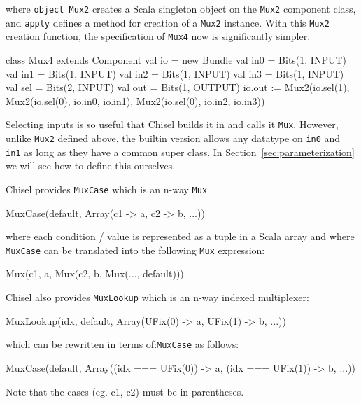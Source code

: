 \documentclass[twocolumn,10pt]{article}
\def\code#1{{\tt #1}}
\begin{document}
\noindent
where \code{object Mux2} creates a Scala singleton object on the \code{Mux2}
component class, and \code{apply} defines a method for creation of a \code{Mux2} instance.
%
With this \code{Mux2} creation function, the specification of \code{Mux4} now is
significantly simpler.

\begin{scala}
class Mux4 extends Component {
  val io = new Bundle {
    val in0 = Bits(1, INPUT)
    val in1 = Bits(1, INPUT)
    val in2 = Bits(1, INPUT)
    val in3 = Bits(1, INPUT)
    val sel = Bits(2, INPUT)
    val out = Bits(1, OUTPUT)
  }
  io.out := Mux2(io.sel(1),
                 Mux2(io.sel(0), io.in0, io.in1),
                 Mux2(io.sel(0), io.in2, io.in3))
}
\end{scala}

Selecting inputs is so useful that Chisel builds it in and calls it
\code{Mux}.  However, unlike \code{Mux2} defined above, the builtin version allows any datatype on
\code{in0} and \code{in1} as long as they have a common super class.
In Section~\ref{sec:parameterization} we will see how to define this
ourselves.

Chisel provides \code{MuxCase} which is an n-way \code{Mux} 
\begin{scala}
MuxCase(default, Array(c1 -> a, c2 -> b, ...))
\end{scala}
 
\noindent
where each condition / value is represented as a tuple in a Scala
array and where \code{MuxCase} can be translated into the following
\code{Mux} expression:

\begin{scala}
Mux(c1, a, Mux(c2, b, Mux(..., default)))
\end{scala}

\noindent
Chisel also provides \code{MuxLookup} which is an n-way indexed multiplexer:

\begin{scala}
MuxLookup(idx, default, 
          Array(UFix(0) -> a, UFix(1) -> b, ...))
\end{scala}

\noindent
which can be rewritten in terms of:\verb+MuxCase+ as follows:

\begin{scala}
MuxCase(default, 
        Array((idx === UFix(0)) -> a, 
              (idx === UFix(1)) -> b, ...))
\end{scala}

\noindent
Note that the cases (eg. c1, c2) must be in parentheses.
\end{document}
